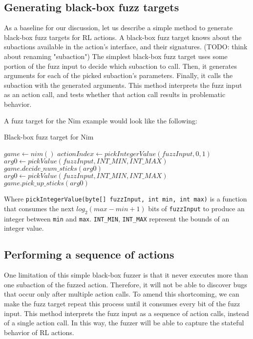 \subsection{Generating black-box fuzz targets}
As a baseline for our discussion, let us describe a simple method to generate black-box fuzz targets for RL actions.
A black-box fuzz target knows about the subactions available in the action's interface, and their signatures. (TODO: think about renaming "subaction")
The simplest black-box fuzz target uses some portion of the fuzz input to decide which subaction to call.
Then, it generates arguments for each of the picked subaction's parameters.
Finally, it calls the subaction with the generated arguments.
This method interprets the fuzz input as an action call, and tests whether that action call results in problematic behavior.

A fuzz target for the Nim example would look like the following:
\begin{algorithm}[H]
    \caption{Black-box fuzz target for Nim}
    \begin{algorithmic}[1]
    \STATE $game \gets nim()$
    \STATE $actionIndex \gets pickIntegerValue(fuzzInput, 0, 1)$
        \STATE $arg0 \gets pickValue(fuzzInput, INT\_MIN, INT\_MAX)$
        \STATE $game.decide\_num\_sticks(arg0)$
    \ENDIF
        \STATE $arg0 \gets pickValue(fuzzInput, INT\_MIN, INT\_MAX)$
        \STATE $game.pick\_up\_sticks(arg0)$
    \ENDIF
    \end{algorithmic}
\end{algorithm}
Where \texttt{pickIntegerValue(byte[] fuzzInput, int min, int max)} is a function that consumes the next $log_2(max - min + 1)$ bits of \texttt{fuzzInput}
 to produce an integer between \texttt{min} and \texttt{max}.
 \texttt{INT\_MIN}, \texttt{INT\_MAX} represent the bounds of an integer value.

\subsection{Performing a sequence of actions}
One limitation of this simple black-box fuzzer is that it never executes more than one subaction of the fuzzed action.
Therefore, it will not be able to discover bugs that occur only after multiple action calls.
To amend this shortcoming, we can make the fuzz target repeat this process until it consumes every bit of the fuzz input.
This method interprets the fuzz input as a sequence of action calls, instead of a single action call.
In this way, the fuzzer will be able to capture the stateful behavior of RL actions.

